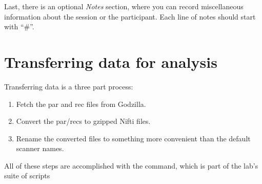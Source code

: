 \documentclass[letterpaper,10pt,openany,oneside]{sphinxmanual}
\begin{document}
Last, there is an optional \emph{Notes} section, where you can record miscellaneous
information about the session or the participant. Each line of notes should
start with ``\#''.


\section{Transferring data for analysis}
\label{data_organization:transferring-data-for-analysis}
Transferring data is a three part process:
\begin{enumerate}
\item {} 
Fetch the par and rec files from Godzilla.

\item {} 
Convert the par/recs to gzipped Nifti files.

\item {} 
Rename the converted files to something more convenient than the default
scanner names.

\end{enumerate}

All of these steps are accomplished with the  command, which is
part of the lab's suite of scripts
\end{document}
